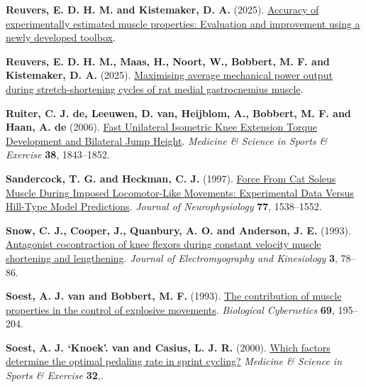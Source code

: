 \documentclass[
  11pt,
  a4paper]{article}
\newlength{\cslhangindent}
\newenvironment{CSLReferences}[2] %
 {\begin{list}{}{%
  \setlength{\itemindent}{0pt}
  \setlength{\leftmargin}{0pt}
  \setlength{\parsep}{0pt}
  \ifodd #1
   \setlength{\leftmargin}{\cslhangindent}
   \setlength{\itemindent}{-1\cslhangindent}
  \fi
  \setlength{\itemsep}{#2\baselineskip}}}
 {\end{list}}
\begin{document}
\begin{CSLReferences}{1}{1}
\textbf{Reuvers, E. D. H. M. and Kistemaker, D. A.} (2025).
\href{https://doi.org/10.1101/2025.09.29.678508}{Accuracy of
experimentally estimated muscle properties: {Evaluation} and improvement
using a newly developed toolbox}.

\textbf{Reuvers, E. D. H. M., Maas, H., Noort, W., Bobbert, M. F. and
Kistemaker, D. A.} (2025).
\href{https://doi.org/10.1101/2025.09.25.678481}{Maximising average
mechanical power output during stretch-shortening cycles of rat medial
gastrocnemius muscle}.

\textbf{Ruiter, C. J. de, Leeuwen, D. van, Heijblom, A., Bobbert, M. F.
and Haan, A. de} (2006).
\href{https://journals.lww.com/acsm-msse/fulltext/2006/10000/fast_unilateral_isometric_knee_extension_torque.21.aspx}{Fast
{Unilateral} {Isometric} {Knee} {Extension} {Torque} {Development} and
{Bilateral} {Jump} {Height}}. \emph{Medicine \& Science in Sports \&
Exercise} \textbf{38}, 1843--1852.

\textbf{Sandercock, T. G. and Heckman, C. J.} (1997).
\href{https://doi.org/10.1152/jn.1997.77.3.1538}{Force {From} {Cat}
{Soleus} {Muscle} {During} {Imposed} {Locomotor}-{Like} {Movements}:
{Experimental} {Data} {Versus} {Hill}-{Type} {Model} {Predictions}}.
\emph{Journal of Neurophysiology} \textbf{77}, 1538--1552.

\textbf{Snow, C. J., Cooper, J., Quanbury, A. O. and Anderson, J. E.}
(1993). \href{https://doi.org/10.1016/1050-6411(93)90002-E}{Antagonist
cocontraction of knee flexors during constant velocity muscle shortening
and lengthening}. \emph{Journal of Electromyography and Kinesiology}
\textbf{3}, 78--86.

\textbf{Soest, A. J. van and Bobbert, M. F.} (1993).
\href{https://doi.org/10.1007/BF00198959}{The contribution of muscle
properties in the control of explosive movements}. \emph{Biological
Cybernetics} \textbf{69}, 195--204.

\textbf{Soest, A. J. `Knoek'. van and Casius, L. J. R.} (2000).
\href{https://journals.lww.com/acsm-msse/fulltext/2000/11000/which_factors_determine_the_optimal_pedaling_rate.17.aspx}{Which
factors determine the optimal pedaling rate in sprint cycling?}
\emph{Medicine \& Science in Sports \& Exercise} \textbf{32},.


\end{CSLReferences}
\end{document}
